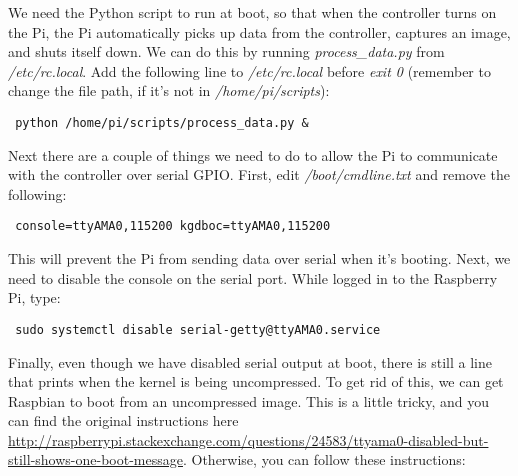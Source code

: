 \documentclass[10pt]{article}
\begin{document}
We need the Python script to run at boot, so that when the controller turns on the Pi, the Pi automatically picks up data from the controller, captures an
image, and shuts itself down. We can do this by running \textit{process\_data.py} from \textit{/etc/rc.local}. Add the following line to \textit{/etc/rc.local} before
\textit{exit 0} (remember to change the file path, if it's not in \textit{/home/pi/scripts}):

\begin{verbatim}
 python /home/pi/scripts/process_data.py &
\end{verbatim}

Next there are a couple of things we need to do to allow the Pi to communicate with the controller over serial GPIO. First, edit \textit{/boot/cmdline.txt} and remove
the following:

\begin{verbatim}
 console=ttyAMA0,115200 kgdboc=ttyAMA0,115200
\end{verbatim}

This will prevent the Pi from sending data over serial when it's booting. Next, we need to disable the console on the serial port. While logged in to the Raspberry Pi,
type:

\begin{verbatim}
 sudo systemctl disable serial-getty@ttyAMA0.service
\end{verbatim}

Finally, even though we have disabled serial output at boot, there is still a line that prints when the kernel is being uncompressed. To get rid of this, we can 
get Raspbian to boot from an uncompressed image. This is a little tricky, and you can find the original instructions here 
\url{http://raspberrypi.stackexchange.com/questions/24583/ttyama0-disabled-but-still-shows-one-boot-message}. Otherwise, you can follow these instructions:
\end{document}
